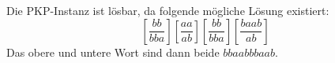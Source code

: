 Die PKP-Instanz ist lösbar, da folgende mögliche Lösung existiert:
\[
\left[\frac{bb}{bba}\right]\left[\frac{aa}{ab}\right]
\left[\frac{bb}{bba}\right]\left[\frac{baab}{ab}\right]
\]
Das obere und untere Wort sind dann beide $bbaabbbaab$.

